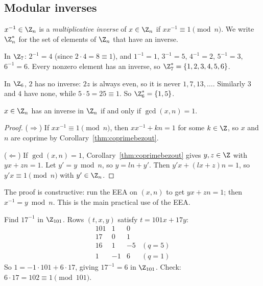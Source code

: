 \subsection{Modular inverses}
\label{sec:7-11}

\begin{definition}
$x^{-1}\in\Z_n$ is a \emph{multiplicative inverse} of $x\in\Z_n$ if $xx^{-1}\equiv1\pmod n$. We write $\Z_n^*$ for the set of elements of $\Z_n$ that have an inverse.
\end{definition}

\begin{example}
In $\Z_7$: $2^{-1}=4$ (since $2\cdot4=8\equiv1$), and $1^{-1}=1$, $3^{-1}=5$, $4^{-1}=2$, $5^{-1}=3$, $6^{-1}=6$. Every nonzero element has an inverse, so $\Z_7^*=\{1,2,3,4,5,6\}$.

In $\Z_6$, $2$ has no inverse: $2z$ is always even, so it is never $1,7,13,\dots$. Similarly $3$ and $4$ have none, while $5\cdot5=25\equiv1$. So $\Z_6^*=\{1,5\}$.
\end{example}

\begin{theorem}
\label{thm:inverse}
$x\in\Z_n$ has an inverse in $\Z_n$ if and only if $\gcd(x,n)=1$.
\end{theorem}
\begin{proof}
($\Rightarrow$) If $xx^{-1}\equiv1\pmod n$, then $xx^{-1}+kn=1$ for some $k\in\Z$, so $x$ and $n$ are coprime by Corollary~\ref{thm:coprimebezout}.

($\Leftarrow$) If $\gcd(x,n)=1$, Corollary~\ref{thm:coprimebezout} gives $y,z\in\Z$ with $yx+zn=1$. Let $y'=y\bmod n$, so $y=ln+y'$. Then $y'x+(lx+z)n=1$, so $y'x\equiv1\pmod n$ with $y'\in\Z_n$.
\end{proof}

\begin{note}
The proof is constructive: run the EEA on $(x,n)$ to get $yx+zn=1$; then $x^{-1}=y\bmod n$. This is the main practical use of the EEA.
\end{note}

\begin{example}
Find $17^{-1}$ in $\Z_{101}$. Rows $(t,x,y)$ satisfy $t=101x+17y$:
\[
\begin{array}{rrrl}
101 & 1 & 0 &\\
17 & 0 & 1 &\\
16 & 1 & -5 & (q=5)\\
1 & -1 & 6 & (q=1)
\end{array}
\]
So $1=-1\cdot101+6\cdot17$, giving $17^{-1}=6$ in $\Z_{101}$. Check: $6\cdot17=102\equiv1\pmod{101}$.
\end{example}

